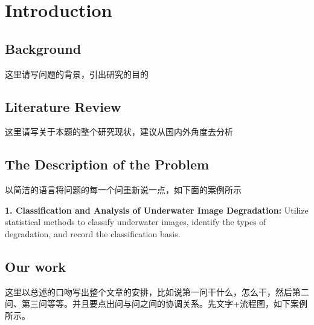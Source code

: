 \documentclass{apmcmthesis}                                             %
\begin{document}
\section{Introduction}

\subsection{Background}

这里请写问题的背景，引出研究的目的

\subsection{Literature Review}

这里请写关于本题的整个研究现状，建议从国内外角度去分析

\subsection{The Description of the Problem}

以简洁的语言将问题的每一个问重新说一点，如下面的案例所示

\textbf{1. Classification and Analysis of Underwater Image Degradation:}
Utilize statistical methods to classify underwater images, identify the types of degradation, and record the classification basis.

\subsection{Our work}

这里以总述的口吻写出整个文章的安排，比如说第一问干什么，怎么干，然后第二问、第三问等等。并且要点出问与问之间的协调关系。先文字+流程图，如下案例所示。
\end{document}
